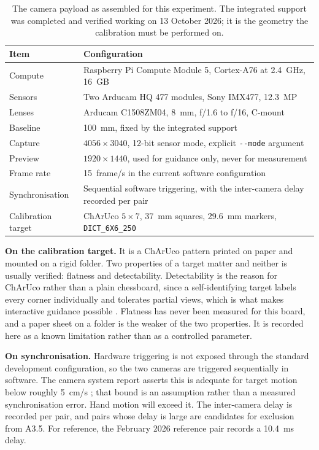 \begin{table}[htbp]
\centering
\caption[Instrument configuration]{The camera payload as assembled for this
experiment. The integrated support was completed and verified working on 13
October 2026; it is the geometry the calibration must be performed on.}
\label{tab:instrument}
\begin{tabularx}{\textwidth}{@{}l X@{}}
\toprule
\textbf{Item} & \textbf{Configuration} \\
\midrule
Compute & Raspberry Pi Compute Module 5, Cortex-A76 at 2.4~GHz, 16~GB \\
Sensors & Two Arducam HQ 477 modules, Sony IMX477, 12.3~MP
          \cite{sony_imx477_datasheet} \\
Lenses & Arducam C1508ZM04, 8~mm, f/1.6 to f/16, C-mount
         \cite{arducam_c1508zm04} \\
Baseline & 100~mm, fixed by the integrated support \\
Capture & $4056 \times 3040$, 12-bit sensor mode, explicit
          \texttt{-{}-mode} argument \\
Preview & $1920 \times 1440$, used for guidance only, never for measurement \\
Frame rate & 15~frame/s in the current software configuration \\
Synchronisation & Sequential software triggering, with the inter-camera delay
                  recorded per pair \\
Calibration target & ChArUco $5 \times 7$, 37~mm squares, 29.6~mm markers,
                     \texttt{DICT\_6X6\_250} \cite{garrido2014aruco} \\
\bottomrule
\end{tabularx}
\end{table}

\textbf{On the calibration target.} It is a ChArUco pattern printed on paper
and mounted on a rigid folder. Two properties of a target matter and neither
is usually verified: flatness and detectability. Detectability is the reason
for ChArUco rather than a plain chessboard, since a self-identifying target
labels every corner individually and tolerates partial views, which is what
makes interactive guidance possible \cite{rojtberg2018pose}. Flatness has
never been measured for this board, and a paper sheet on a folder is the
weaker of the two properties. It is recorded here as a known limitation
rather than as a controlled parameter.

\textbf{On synchronisation.} Hardware triggering is not exposed through the
standard development configuration, so the two cameras are triggered
sequentially in software. The camera system report asserts this is adequate
for target motion below roughly 5~cm/s \cite{linku_d5_camera_report}; that
bound is an assumption rather than a measured synchronisation error. Hand
motion will exceed it. The inter-camera delay is recorded per pair, and pairs
whose delay is large are candidates for exclusion from A3.5. For reference,
the February 2026 reference pair records a 10.4~ms delay.

